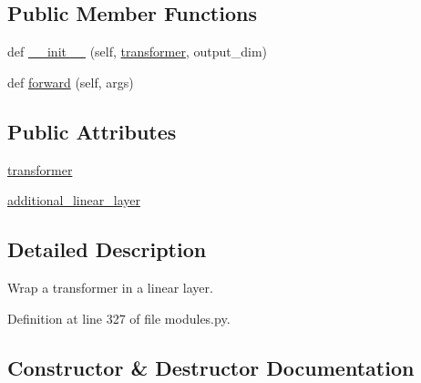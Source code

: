 \subsection*{Public Member Functions}
\begin{DoxyCompactItemize}
\item 
def \hyperlink{classparlai_1_1agents_1_1transformer_1_1modules_1_1TransformerLinearWrapper_a2676a49582292330a7829e235a7cf8f5}{\+\_\+\+\_\+init\+\_\+\+\_\+} (self, \hyperlink{classparlai_1_1agents_1_1transformer_1_1modules_1_1TransformerLinearWrapper_acac2d2f099f07b21f792326f90541ffd}{transformer}, output\+\_\+dim)
\item 
def \hyperlink{classparlai_1_1agents_1_1transformer_1_1modules_1_1TransformerLinearWrapper_a82f571e85719bde36f8fcf09f27d3e4c}{forward} (self, args)
\end{DoxyCompactItemize}
\subsection*{Public Attributes}
\begin{DoxyCompactItemize}
\item 
\hyperlink{classparlai_1_1agents_1_1transformer_1_1modules_1_1TransformerLinearWrapper_acac2d2f099f07b21f792326f90541ffd}{transformer}
\item 
\hyperlink{classparlai_1_1agents_1_1transformer_1_1modules_1_1TransformerLinearWrapper_af083195926e1f091010ecb4c6d409a2a}{additional\+\_\+linear\+\_\+layer}
\end{DoxyCompactItemize}


\subsection{Detailed Description}
\begin{DoxyVerb}Wrap a transformer in a linear layer.
\end{DoxyVerb}
 

Definition at line 327 of file modules.\+py.



\subsection{Constructor \& Destructor Documentation}
\mbox{\label{classparlai_1_1agents_1_1transformer_1_1modules_1_1TransformerLinearWrapper_a2676a49582292330a7829e235a7cf8f5}} 
